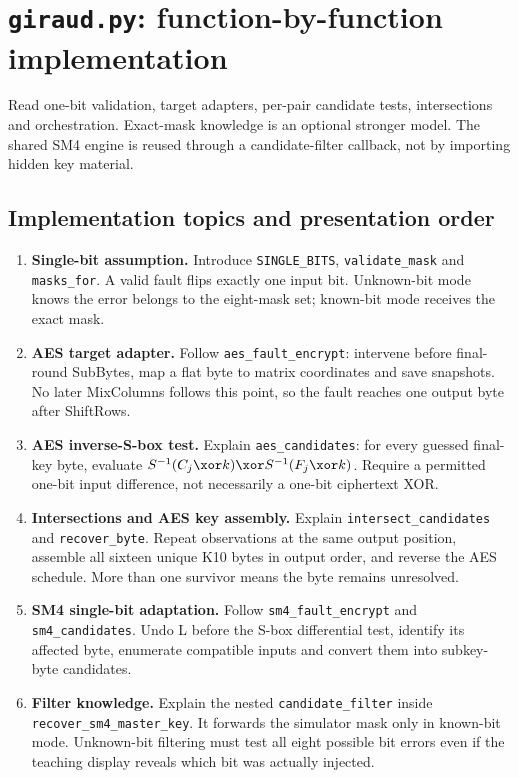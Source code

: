 \section{\texttt{giraud.py}: function-by-function implementation}
Read one-bit validation, target adapters, per-pair candidate tests, intersections and orchestration. Exact-mask knowledge is an optional stronger model. The shared SM4 engine is reused through a candidate-filter callback, not by importing hidden key material.

\subsection{Implementation topics and presentation order}
\begin{enumerate}
\item \textbf{Single-bit assumption.} Introduce \texttt{SINGLE\_BITS}, \texttt{validate\_mask} and \texttt{masks\_for}. A valid fault flips exactly one input bit. Unknown-bit mode knows the error belongs to the eight-mask set; known-bit mode receives the exact mask.
\item \textbf{AES target adapter.} Follow \texttt{aes\_fault\_encrypt}: intervene before final-round SubBytes, map a flat byte to matrix coordinates and save snapshots. No later MixColumns follows this point, so the fault reaches one output byte after ShiftRows.
\item \textbf{AES inverse-S-box test.} Explain \texttt{aes\_candidates}: for every guessed final-key byte, evaluate $S^{-1}(C_j\xor k)\xor S^{-1}(F_j\xor k)$. Require a permitted one-bit input difference, not necessarily a one-bit ciphertext XOR.
\item \textbf{Intersections and AES key assembly.} Explain \texttt{intersect\_candidates} and \texttt{recover\_byte}. Repeat observations at the same output position, assemble all sixteen unique K10 bytes in output order, and reverse the AES schedule. More than one survivor means the byte remains unresolved.
\item \textbf{SM4 single-bit adaptation.} Follow \texttt{sm4\_fault\_encrypt} and \texttt{sm4\_candidates}. Undo L before the S-box differential test, identify its affected byte, enumerate compatible inputs and convert them into subkey-byte candidates.
\item \textbf{Filter knowledge.} Explain the nested \texttt{candidate\_filter} inside \texttt{recover\_sm4\_master\_key}. It forwards the simulator mask only in known-bit mode. Unknown-bit filtering must test all eight possible bit errors even if the teaching display reveals which bit was actually injected.

\end{enumerate}

